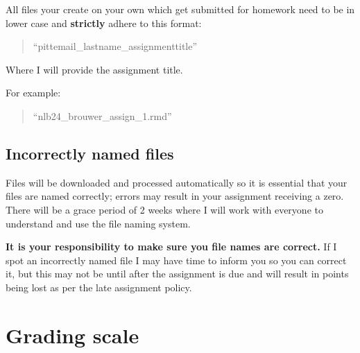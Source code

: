 \documentclass[
]{book}
\begin{document}
All files your create on your own which get submitted for homework need to be in lower case and \textbf{strictly} adhere to this format:

\begin{quote}
``pittemail\_lastname\_assignmenttitle''
\end{quote}

Where I will provide the assignment title.

For example:

\begin{quote}
``nlb24\_brouwer\_assign\_1.rmd''
\end{quote}

\hypertarget{incorrectly-named-files}{%
\section{Incorrectly named files}\label{incorrectly-named-files}}

Files will be downloaded and processed automatically so it is essential that your files are named correctly; errors may result in your assignment receiving a zero. There will be a grace period of 2 weeks where I will work with everyone to understand and use the file naming system.

\textbf{It is your responsibility to make sure you file names are correct.} If I spot an incorrectly named file I may have time to inform you so you can correct it, but this may not be until after the assignment is due and will result in points being lost as per the late assignment policy.

\hypertarget{grading-scale}{%
\chapter{Grading scale}\label{grading-scale}}
\end{document}
